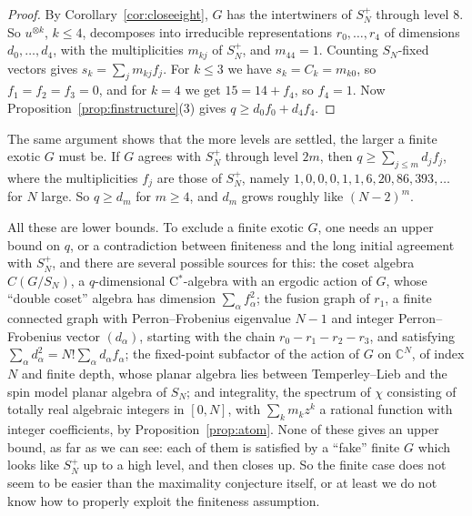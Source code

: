 \documentclass[11pt]{amsart}
\theoremstyle{definition}
\theoremstyle{remark}
\theoremstyle{plain}
\numberwithin{equation}{section}
\numberwithin{table}{section}
\newcommand{\C}{\mathbb C}
\begin{document}
\begin{proof}
By Corollary~\ref{cor:closeeight}, $G$ has the intertwiners of $S_N^+$ through level $8$. So $u^{\otimes k}$, $k\le4$, decomposes into irreducible representations $r_0,\dots,r_4$ of dimensions $d_0,\dots,d_4$, with the multiplicities $m_{kj}$ of $S_N^+$, and $m_{44}=1$. Counting $S_N$-fixed vectors gives $s_k=\sum_jm_{kj}f_j$. For $k\le3$ we have $s_k=C_k=m_{k0}$, so $f_1=f_2=f_3=0$, and for $k=4$ we get $15=14+f_4$, so $f_4=1$. Now Proposition~\ref{prop:finstructure}(3) gives $q\ge d_0f_0+d_4f_4$.
\end{proof}

The same argument shows that the more levels are settled, the larger a finite exotic $G$ must be. If $G$ agrees with $S_N^+$ through level $2m$, then $q\ge\sum_{j\le m}d_jf_j$, where the multiplicities $f_j$ are those of $S_N^+$, namely $1,0,0,0,1,1,6,20,86,393,\dots$ for $N$ large. So $q\ge d_m$ for $m\ge4$, and $d_m$ grows roughly like $(N-2)^m$.

All these are lower bounds. To exclude a finite exotic $G$, one needs an upper bound on $q$, or a contradiction between finiteness and the long initial agreement with $S_N^+$, and there are several possible sources for this: the coset algebra $C(G/S_N)$, a $q$-dimensional C$^*$-algebra with an ergodic action of $G$, whose ``double coset'' algebra has dimension $\sum_\alpha f_\alpha^2$; the fusion graph of $r_1$, a finite connected graph with Perron--Frobenius eigenvalue $N-1$ and integer Perron--Frobenius vector $(d_\alpha)$, starting with the chain $r_0-r_1-r_2-r_3$, and satisfying $\sum_\alpha d_\alpha^2=N!\sum_\alpha d_\alpha f_\alpha$; the fixed-point subfactor of the action of $G$ on $\C^N$, of index $N$ and finite depth, whose planar algebra lies between Temperley--Lieb and the spin model planar algebra of $S_N$; and integrality, the spectrum of $\chi$ consisting of totally real algebraic integers in $[0,N]$, with $\sum_km_kz^k$ a rational function with integer coefficients, by Proposition~\ref{prop:atom}. None of these gives an upper bound, as far as we can see: each of them is satisfied by a ``fake'' finite $G$ which looks like $S_N^+$ up to a high level, and then closes up. So the finite case does not seem to be easier than the maximality conjecture itself, or at least we do not know how to properly exploit the finiteness assumption.


\end{document}
